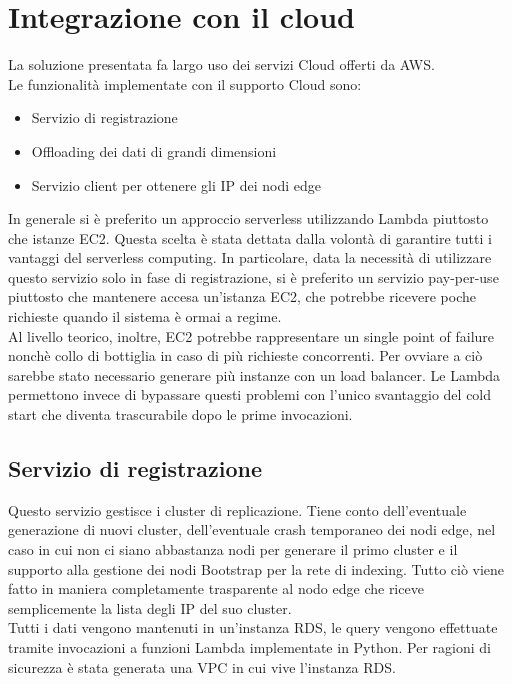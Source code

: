 \documentclass[conference]{IEEEtran}
\begin{document}
\section{Integrazione con il cloud}
La soluzione presentata fa largo uso dei servizi Cloud offerti da AWS.\\Le funzionalità implementate con il supporto Cloud
sono:
\begin{itemize}
  \item{Servizio di registrazione}
  \item{Offloading dei dati di grandi dimensioni}
  \item{Servizio client per ottenere gli IP dei nodi edge}
\end{itemize}

In generale si è preferito un approccio serverless utilizzando Lambda piuttosto che istanze EC2. Questa scelta è stata dettata
dalla volontà di garantire tutti i vantaggi del serverless computing. In particolare, data la necessità di utilizzare questo servizio solo
in fase di registrazione, si è preferito un servizio pay-per-use piuttosto che mantenere accesa un'istanza EC2, che potrebbe
ricevere poche richieste quando il sistema è ormai a regime.\\
Al livello teorico, inoltre, EC2 potrebbe rappresentare un single point of failure nonchè collo di bottiglia in caso di più
richieste concorrenti. Per ovviare a ciò sarebbe stato necessario generare più instanze con un load balancer.
Le Lambda permettono invece di bypassare questi problemi con l'unico svantaggio del cold start che diventa trascurabile
dopo le prime invocazioni.

\subsection{Servizio di registrazione}
Questo servizio gestisce i cluster di replicazione. Tiene conto dell'eventuale generazione di nuovi cluster, dell'eventuale
crash temporaneo dei nodi edge, nel caso in cui non ci siano abbastanza nodi per generare il primo cluster e il supporto alla
gestione dei nodi Bootstrap per la rete di indexing. Tutto ciò viene fatto in maniera completamente trasparente al nodo edge che riceve semplicemente la lista
degli IP del suo cluster.\\
Tutti i dati vengono mantenuti in un'instanza RDS, le query vengono effettuate tramite invocazioni a funzioni Lambda implementate
in Python. Per ragioni di sicurezza è stata generata una VPC in cui vive l'instanza RDS.
\end{document}

